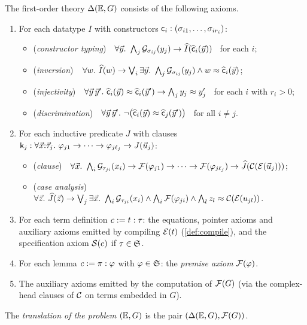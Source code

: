 \begin{definition}
\label{def:theory}
The first-order theory $\Delta(\mathbb{E},G)$ consists of the following axioms.
\begin{enumerate}[leftmargin=2em]
\item For each datatype $I$ with constructors $\mathsf{c}_i :
  (\sigma_{i1}, \dots, \sigma_{ir_i})$:
  \begin{itemize}
  \item (\emph{constructor typing})\ \
    $\forall \vec{y}.\ \bigwedge_j \mathcal{G}_{\sigma_{ij}}(y_j) \to
     \widehat{I}(\widehat{\mathsf{c}}_i(\vec{y}))$ \ for each $i$;
  \item (\emph{inversion})\ \
    $\forall w.\ \Ihat{I}(w) \to \bigvee_i \exists \tup{y}.\
     \bigwedge_j \guard{\sigma_{ij}}{y_j} \wedge
     w \feq \Ihat{\wcns{c}}_i(\tup{y})$;
  \item (\emph{injectivity})\ \
    $\forall \vec{y}\,\vec{y}'.\ \widehat{\mathsf{c}}_i(\vec{y}) \approx
     \widehat{\mathsf{c}}_i(\vec{y}') \to \bigwedge_j y_j \approx y'_j$ \ for
     each $i$ with $r_i > 0$;
  \item (\emph{discrimination})\ \
    $\forall \vec{y}\,\vec{y}'.\ \neg\bigl(\widehat{\mathsf{c}}_i(\vec{y})
     \approx \widehat{\mathsf{c}}_j(\vec{y}')\bigr)$ \ for all $i \neq j$.
  \end{itemize}
\item For each inductive predicate $J$ with clauses $\mathsf{k}_j : \forall
  \vec{x}{:}\vec{\tau}_j.\ \varphi_{j1} \to \dots \to \varphi_{j\ell_j}
  \to J(\vec{u}_j)$:
  \begin{itemize}
  \item (\emph{clause})\ \
    $\forall \tup{x}.\ \bigwedge_i \guard{\tau_{ji}}{x_i} \to
     \F{\varphi_{j1}} \to \dots \to \F{\varphi_{j\ell_j}} \to
     \Ihat{J}(\compf(\erase{\tup{u}_j}))$;
  \item (\emph{case analysis})\ \
    $\forall \vec{z}.\ \widehat{J}(\vec{z}) \to \bigvee_j \exists
     \vec{x}.\ \bigwedge_i \mathcal{G}_{\tau_{ji}}(x_i) \wedge \bigwedge_i
     \mathcal{F}(\varphi_{ji}) \wedge \bigwedge_l z_l \approx
     \mathcal{C}(\mathcal{E}(u_{jl}))$.
  \end{itemize}
\item For each term definition $c \mathrel{:=} t : \tau$: the equations, pointer
  axioms and auxiliary axioms emitted by compiling $\mathcal{E}(t)$
  (\cref{def:compile}), and the specification axiom $\mathcal{S}(c)$ if $\tau
  \in \mathfrak{S}$.
\item For each lemma $c \mathrel{:=} \pi : \varphi$ with $\varphi \in \mathfrak{S}$:
  the \emph{premise axiom} $\mathcal{F}(\varphi)$.
\item The auxiliary axioms emitted by the computation of $\mathcal{F}(G)$ (via the
  complex-head clauses of $\mathcal{C}$ on terms embedded in $G$).
\end{enumerate}
The \emph{translation of the problem} $(\mathbb{E}, G)$ is the pair $(\Delta(\mathbb{E},G),
\mathcal{F}(G))$.
\end{definition}

